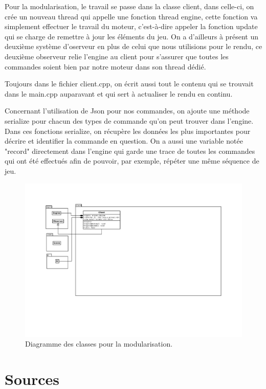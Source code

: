 \documentclass[a4paper,12pt]{article}
\begin{document}
Pour la modularisation, le travail se passe dans la classe client, dans celle-ci, on crée un nouveau thread qui appelle une fonction thread engine, cette fonction va simplement effectuer le travail du moteur, c'est-à-dire appeler la fonction update qui se charge de remettre à jour les éléments du jeu. On a d'ailleurs à présent un deuxième système d'oserveur en plus de celui que nous utilisions pour le rendu, ce deuxième observeur relie l'engine au client pour s'assurer que toutes les commandes soient bien par notre moteur dans son thread dédié.

Toujours dans le fichier client.cpp, on écrit aussi tout le contenu qui se trouvait dans le main.cpp auparavant et qui sert à actualiser le rendu en continu.

\bigbreak
Concernant l'utilisation de Json pour nos commandes, on ajoute une méthode serialize pour chacun des types de commande qu'on peut trouver dans l'engine. Dans ces fonctions serialize, on récupère les données les plus importantes pour décrire et identifier la commande en question.
On a aussi une variable notée "record" directement dans l'engine qui garde une trace de toutes les commandes qui ont été effectués afin de pouvoir, par exemple, répéter une même séquence de jeu.

\begin{landscape}
\begin{figure}[p]
\includegraphics[width=0.9\paperheight]{client.pdf}
\caption{\label{uml:module}Diagramme des classes pour la modularisation.} 
\end{figure}
\end{landscape}
\section*{Sources}

\end{document}
